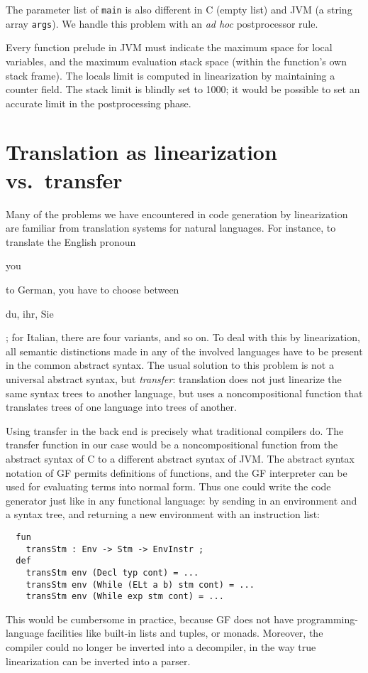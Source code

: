 \documentclass[12pt]{article}
\newcommand{\empha}[1]{{\em #1}}
\newcommand{\eex}[1]{\begin{em}#1\end{em}}
\begin{document}
The parameter list of \texttt{main} is also different in C (empty list)
and JVM (a string array \texttt{args}). We handle this problem
with an \empha{ad hoc} postprocessor rule.

Every function prelude in JVM must indicate the maximum space for
local variables, and the maximum evaluation stack space (within
the function's own stack frame). The locals limit is computed in
linearization by maintaining a counter field. The stack limit
is blindly set to 1000; it would be possible to set an
accurate limit in the postprocessing phase.


\section{Translation as linearization vs.\ transfer}

Many of the problems we have encountered in code generation by
linearization are familiar from
translation systems for natural languages. For instance, to translate
the English pronoun \eex{you} to German, you have to choose
between \eex{du, ihr, Sie}; for Italian, there are four
variants, and so on. To deal with this by linearization,
all semantic distinctions made in any of the involved languages 
have to be present in the common abstract syntax. The usual solution to 
this problem is not a universal abstract syntax, but
\empha{transfer}: translation does not just linearize
the same syntax trees to another language, but uses
a noncompositional function that translates
trees of one language into trees of another.

Using transfer in the
back end is precisely what traditional compilers do.
The transfer function in our case would be a noncompositional
function from the abstract syntax of C to a different abstract
syntax of JVM. The abstract syntax notation of GF permits
definitions of functions, and the GF interpreter can be used
for evaluating terms into normal form. Thus one could write
the code generator just like in any functional language:
by sending in an environment and a syntax tree, and
returning a new environment with an instruction list:
\begin{verbatim}
  fun 
    transStm : Env -> Stm -> EnvInstr ;
  def
    transStm env (Decl typ cont) = ... 
    transStm env (While (ELt a b) stm cont) = ... 
    transStm env (While exp stm cont) = ... 
\end{verbatim}
This would be cumbersome in practice, because
GF does not have programming-language facilities 
like built-in lists and tuples, or monads. Moreover,
the compiler could no longer be inverted into a decompiler, 
in the way true linearization can be inverted into a parser.
\end{document}

